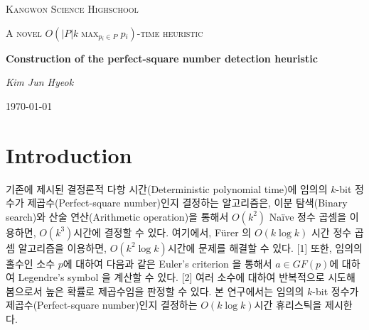 \documentclass{article}
\begin{document}
    \begin{titlepage}
        \centering
	    {\scshape\LARGE Kangwon Science Highschool \par}
	    \vspace{1cm}
	    {\scshape\Large A novel $O(|P|k\max_{p_i \in P}{p_i})$-time heuristic\par}
        \vspace{1.5cm}
	    {\huge\bfseries Construction of the perfect-square number detection heuristic\par}
	    \vspace{2cm}
	    {\Large\itshape Kim Jun Hyeok\par}
	    \vfilla
	    {\large \today\par}
    \end{titlepage}
    \linespread{1.5}
    \begin{abstract}
        기존에 이분 탐색과 산술(Arithmetic) 연산을 이용하여 제시되었던 $k$-bit 정수에 대하여 $O(k^{3})$혹은 $O(k^{2}\log{k})$시간 결정론적 알고리즘은 매우 큰 수에 대해서는 시간이 오래 걸리는 결점이 있다.
        이 연구에서는, 빅데이터 분석을 통해서 임의의 홀수인 소수에 관한 이차 잉여(Quadratic-residue)에 대하여 Euler’s criterion 을 이용한 완전 제곱수 휴리스틱(Heuristic) 제시와 유의미한 높은 확률로 판정 가능한 소수들의 최소 개수를 제시하는 것을 목표로 한다. 
        또한, 후속 연구 방안으로 임의의 제곱수를 비트로 표현하였을 때 임의의 개수의 제곱수에 관하여 LCS(Longest-common- sequence)를 구하여 여기에서 찾은 LCS 를 통해서 매칭하는 휴리스틱을 제시하고, 위의 방법과 결합하여 더욱 판정률을 높인다.
    \end{abstract}
    \tableofcontents
    \newpage
    \section[도입]{Introduction}
        기존에 제시된 결정론적 다항 시간(Deterministic polynomial time)에 임의의 $k$-bit 정수가 제곱수(Perfect-square number)인지 결정하는 알고리즘은, 이분 탐색(Binary search)와 산술 연산(Arithmetic operation)을 통해서 $O(k^{2})$ Naïve 정수 곱셈을 이용하면, $O(k^{3})$시간에 결정할 수 있다.
        여기에서, Fürer 의 $O(k\log{k})$ 시간 정수 곱셈 알고리즘을 이용하면, $O(k^{2}\log{k})$시간에 문제를 해결할 수 있다. [1]
        또한, 임의의 홀수인 소수 $p$에 대하여 다음과 같은 Euler’s criterion 을 통해서 $a \in GF(p)$에 대하여 Legendre’s symbol 을 계산할 수 있다. [2]
        여러 소수에 대하여 반복적으로 시도해봄으로서 높은 확률로 제곱수임을 판정할 수 있다.
        본 연구에서는 임의의 $k$-bit 정수가 제곱수(Perfect-square number)인지 결정하는 $O(k\log{k})$시간 휴리스틱을 제시한다.
\end{document}
